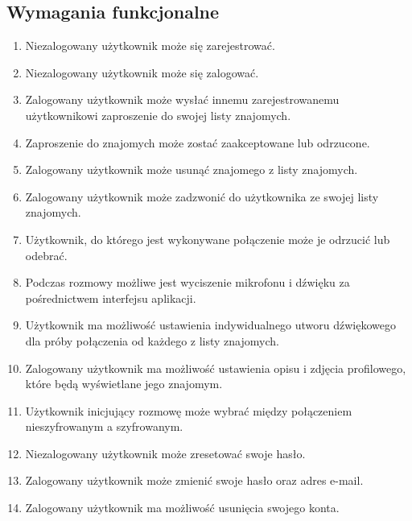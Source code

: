 \documentclass{article}
\begin{document}
  \subsection{Wymagania funkcjonalne}
  \begin{enumerate}
    \item Niezalogowany użytkownik może się zarejestrować.
    \item Niezalogowany użytkownik może się zalogować.
    \item Zalogowany użytkownik może wysłać innemu zarejestrowanemu użytkownikowi zaproszenie do swojej listy znajomych.
    \item Zaproszenie do znajomych może zostać zaakceptowane lub odrzucone.
    \item Zalogowany użytkownik może usunąć znajomego z listy znajomych.
    \item Zalogowany użytkownik może zadzwonić do użytkownika ze swojej listy znajomych.
    \item Użytkownik, do którego jest wykonywane połączenie może je odrzucić lub odebrać.
    \item Podczas rozmowy możliwe jest wyciszenie mikrofonu i dźwięku za pośrednictwem interfejsu aplikacji.
    \item Użytkownik ma możliwość ustawienia indywidualnego utworu dźwiękowego dla próby połączenia od każdego z listy znajomych.
    \item Zalogowany użytkownik ma możliwość ustawienia opisu i zdjęcia profilowego, które będą wyświetlane jego znajomym.
    \item Użytkownik inicjujący rozmowę może wybrać między połączeniem nieszyfrowanym a szyfrowanym.
    \item Niezalogowany użytkownik może zresetować swoje hasło.
    \item Zalogowany użytkownik może zmienić swoje hasło oraz adres e-mail.
    \item Zalogowany użytkownik ma możliwość usunięcia swojego konta.
  \end{enumerate}
\end{document}
